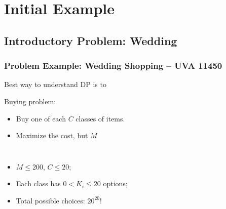 \documentclass{beamer}
\begin{document}
\section{Initial Example}

\subsection{Introductory Problem: Wedding}

\begin{frame}
    \frametitle{Problem Example: Wedding Shopping -- UVA 11450}

    \begin{block}{}
      Best way to understand DP is to 
    \end{block}

    \vfill

    Buying problem:
    \begin{itemize}
    \item Buy one of each $C$ classes of items.
    \item Maximize the cost, but  $M$
    \end{itemize}

    \medskip

    \begin{columns}
      \begin{itemize}
      \item $M \leq 200$, $C \leq 20$;
      \item Each class has $0 < K_i \leq 20$ options;
      \item Total possible choices: $20^{20}$!
      \end{itemize}


\end{columns}
\end{frame}
\end{document}
